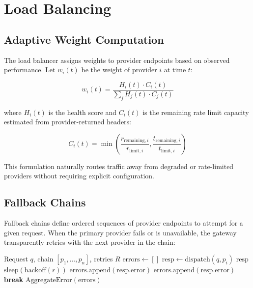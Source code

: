 \section{Load Balancing}

\label{sec:loadbalancing}

\subsection{Adaptive Weight Computation}

The load balancer assigns weights to provider endpoints based on observed performance. Let $w_i(t)$ be the weight of provider $i$ at time $t$:

\begin{equation}
w_i(t) = \frac{H_i(t) \cdot C_i(t)}{\sum_j H_j(t) \cdot C_j(t)}
\end{equation}

where $H_i(t)$ is the health score and $C_i(t)$ is the remaining rate limit capacity estimated from provider-returned headers:

\begin{equation}
C_i(t) = \min\left(\frac{r_{\text{remaining},i}}{r_{\text{limit},i}}, \frac{t_{\text{remaining},i}}{t_{\text{limit},i}}\right)
\end{equation}

This formulation naturally routes traffic away from degraded or rate-limited providers without requiring explicit configuration.

\subsection{Fallback Chains}

Fallback chains define ordered sequences of provider endpoints to attempt for a given request. When the primary provider fails or is unavailable, the gateway transparently retries with the next provider in the chain:

\begin{algorithm}[t]
\caption{Fallback Chain Execution}
\label{alg:fallback}
\begin{algorithmic}[1]
\REQUIRE Request $q$, chain $[p_1, \ldots, p_n]$, retries $R$
\STATE $\text{errors} \gets []$
        \STATE $\text{resp} \gets \text{dispatch}(q, p_i)$
            \RETURN $\text{resp}$
            \STATE $\text{sleep}(\text{backoff}(r))$
            \STATE $\text{errors.append}(\text{resp.error})$
        \ELSE
            \STATE $\text{errors.append}(\text{resp.error})$
            \STATE \textbf{break} 
        \ENDIF
    \ENDFOR
\ENDFOR
\RETURN $\text{AggregateError}(\text{errors})$
\end{algorithmic}
\end{algorithm}

